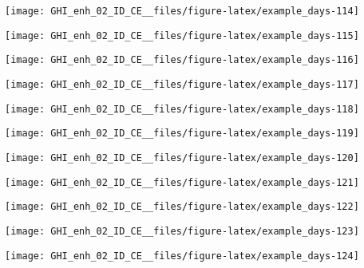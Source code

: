 \documentclass[
  10pt,
  a4paper,oneside]{article}
\begin{document}
\begin{center}\texttt{[image: GHI\_enh\_02\_ID\_CE\_\_files/figure-latex/example\_days-114]} \end{center}

\begin{center}\texttt{[image: GHI\_enh\_02\_ID\_CE\_\_files/figure-latex/example\_days-115]} \end{center}

\begin{center}\texttt{[image: GHI\_enh\_02\_ID\_CE\_\_files/figure-latex/example\_days-116]} \end{center}

\begin{center}\texttt{[image: GHI\_enh\_02\_ID\_CE\_\_files/figure-latex/example\_days-117]} \end{center}

\begin{center}\texttt{[image: GHI\_enh\_02\_ID\_CE\_\_files/figure-latex/example\_days-118]} \end{center}

\begin{center}\texttt{[image: GHI\_enh\_02\_ID\_CE\_\_files/figure-latex/example\_days-119]} \end{center}

\begin{center}\texttt{[image: GHI\_enh\_02\_ID\_CE\_\_files/figure-latex/example\_days-120]} \end{center}

\begin{center}\texttt{[image: GHI\_enh\_02\_ID\_CE\_\_files/figure-latex/example\_days-121]} \end{center}

\begin{center}\texttt{[image: GHI\_enh\_02\_ID\_CE\_\_files/figure-latex/example\_days-122]} \end{center}

\begin{center}\texttt{[image: GHI\_enh\_02\_ID\_CE\_\_files/figure-latex/example\_days-123]} \end{center}

\begin{center}\texttt{[image: GHI\_enh\_02\_ID\_CE\_\_files/figure-latex/example\_days-124]} \end{center}
\end{document}
